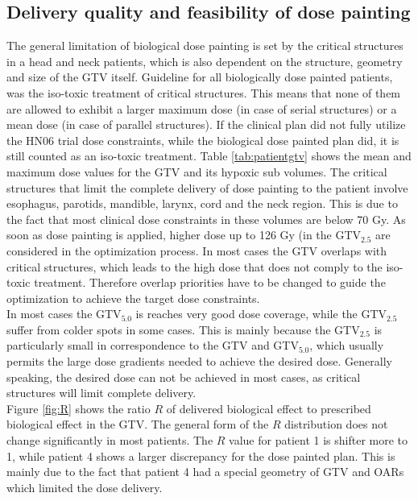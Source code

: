 \subsection{Delivery quality and feasibility of dose painting}The general limitation of biological dose painting is set by the critical structures in a head and neck patients, which is also dependent on the structure, geometry and size of the GTV itself. Guideline for all biologically dose painted patients, was the iso-toxic treatment of critical structures. This means that none of them are allowed to exhibit a larger maximum dose (in case of serial structures) or a mean dose (in case of parallel structures). If the clinical plan did not fully utilize the HN06 trial dose constraints, while the biological dose painted plan did, it is still counted as an iso-toxic treatment. Table \ref{tab:patientgtv} shows the mean and maximum dose values for the GTV and its hypoxic sub volumes. The critical structures that limit the complete delivery of dose painting to the patient involve esophagus, parotids, mandible, larynx, cord and the neck region. This is due to the fact that most clinical dose constraints in these volumes are below 70 Gy. As soon as dose painting is applied, higher dose up to 126 Gy (in the GTV$_{2.5}$ are considered in the optimization process. In most cases the GTV overlaps with critical structures, which leads to the high dose that does not comply to the iso-toxic treatment. Therefore overlap priorities have to be changed to guide the optimization to achieve the target dose constraints.\\In most cases the GTV$_{5.0}$ is reaches very good dose coverage, while the GTV$_{2.5}$ suffer from colder spots in some cases. This is mainly because the GTV$_{2.5}$ is particularly small in correspondence to the GTV and GTV$_{5.0}$, which usually permits the large dose gradients needed to achieve the desired dose. Generally speaking, the desired dose can not be achieved in most cases, as critical structures will limit complete delivery.\\Figure \ref{fig:R} shows the ratio $R$ of delivered biological effect to prescribed biological effect in the GTV. The general form of the $R$ distribution does not change significantly in most patients. The $R$ value for patient 1 is shifter more to 1, while patient 4 shows a larger discrepancy for the dose painted plan. This is mainly due to the fact that patient 4 had a special geometry of GTV and OARs which limited the dose delivery.
\begin{sidewaysfigure}[p]
\centering
{}
\caption{Ratio $R$ of delivered biological effect in the GTV divided by the prescribed effect. If $R>1$, the voxel is over dose, while $R<1$ can be interpreted as under dose. $R$ distributions show clinical plan (green) and dose painted plan (red).}
\label{fig:R}
\end{sidewaysfigure}
